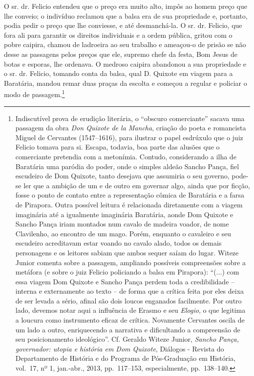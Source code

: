 O sr. dr. Felicio entendeu que o preço era muito alto, impôs ao homem
preço que lhe conveio; o indivíduo reclamou que a balsa era de sua
propriedade e, portanto, podia pedir o preço que lhe conviesse, e até
desmanchá-la. O sr. dr. Felicio, que fora ali para garantir os direitos
individuais e a ordem pública, gritou com o pobre caipira, chamou de
ladroeira ao seu trabalho e ameaçou-o de prisão se não desse as
passagens pelos preços que ele, supremo chefe da festa, Bom Jesus de
botas e esporas, lhe ordenava. O medroso caipira abandonou a sua
propriedade e o sr. dr. Felicio, tomando conta da balsa, qual D. Quixote
em viagem para a Baratária, mandou remar duas praças da escolta e
começou a regular e policiar o modo de passagem.\footnote{ Indiscutível
  prova de erudição literária, o ``obscuro comerciante'' sacava uma
  passagem da obra \emph{Don Quixote de la Mancha}, criação do poeta e
  romancista Miguel de Cervantes (1547--1616), para ilustrar o papel
  esdrúxulo que o juiz Felicio tomava para si. Escapa, todavia, boa
  parte das alusões que o comerciante pretendia com a metonímia.
  Contudo, considerando a ilha de Baratária uma paródia do poder, onde o
  simples aldeão Sancho Pança, fiel escudeiro de Dom Quixote, tanto
  desejava que assumiria o seu governo, pode-se ler que a ambição de um
  e de outro em governar algo, ainda que por ficção, fosse o ponto de
  contato entre a representação cômica de Baratária e a farsa de
  Pirapora. Outra possível leitura é relacionada diretamente com a
  viagem imaginária até a igualmente imaginária Baratária, aonde Dom
  Quixote e Sancho Pança iriam montados num cavalo de madeira voador, de
  nome Clavilenho, ao encontro de um mago. Porém, enquanto o cavaleiro e
  seu escudeiro acreditavam estar voando no cavalo alado, todos os
  demais personagens e os leitores sabiam que ambos sequer saíam do
  lugar. Witeze Junior comenta sobre a passagem, ampliando possíveis
  compreensões sobre a metáfora (e sobre o juiz Felicio policiando a
  balsa em Pirapora): ``(...) com essa viagem Dom Quixote e Sancho Pança
  perdem toda a credibilidade -- interna e externamente ao texto -- de
  forma que a crítica feita por eles deixa de ser levada a sério, afinal
  são dois loucos enganados facilmente. Por outro lado, devemos notar
  aqui a influência de Erasmo e seu \emph{Elogio}, o que legitima a
  loucura como instrumento eficaz de crítica. Novamente Cervantes oscila
  de um lado a outro, enriquecendo a narrativa e dificultando a
  compreensão de seu posicionamento ideológico''. Cf. Geraldo Witeze
  Junior, \emph{Sancho Pança, governador: utopia e história em Dom
  Quixote}, Diálogos - Revista do Departamento de História e do Programa
  de Pós-Graduação em História, vol.~17, nº 1, jan.-abr., 2013,
  pp.~117--153, especialmente, pp.~138--140.}

